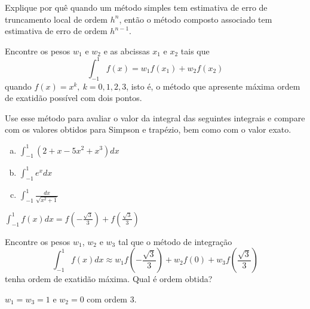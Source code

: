 \begin{exer} Explique por quê quando um método simples tem estimativa de erro de truncamento local de ordem $h^n$, então o método composto associado tem estimativa de erro de ordem $h^{n-1}$.
\end{exer}

\begin{exer} Encontre os pesos $w_1$ e $w_2$ e as abcissas $x_1$ e $x_2$ tais que
\begin{equation} \int_{-1}^1f(x)=w_1f(x_1)+w_2f(x_2) \end{equation}
quando $f(x)=x^k, ~k=0,1,2,3$, isto é, o método que apresente máxima ordem de exatidão possível com dois pontos.

Use esse método para avaliar o valor da integral das seguintes integrais e compare com os valores obtidos para Simpson e trapézio, bem como com o valor exato.
\begin{enumerate}[a)]
\item $\displaystyle \int_{-1}^1\left(2+x-5x^2+x^3\right)dx$
\item $\displaystyle \int_{-1}^1e^{x}dx$
\item $\displaystyle \int_{-1}^1\frac{dx}{\sqrt{x^2+1}}$
\end{enumerate}
\end{exer}
\begin{resp}
  $\displaystyle \int_{-1}^1f(x)dx=f\left(-\frac{\sqrt{3}}{3}\right)+f\left(\frac{\sqrt{3}}{3}\right)$
\end{resp}


\begin{exer} Encontre os pesos $w_1$, $w_2$ e $w_3$ tal que o método de integração
\begin{equation} \int_{-1}^1 f(x)dx \approx w_1 f\left(-\frac{\sqrt{3}}{3}\right)  + w_2f(0) + w_3f\left(\frac{\sqrt{3}}{3}\right) \end{equation}
tenha ordem de exatidão máxima. Qual é ordem obtida?
\end{exer}
\begin{resp}
  $w_1=w_3=1$ e $w_2=0$ com ordem 3.
\end{resp}


%
